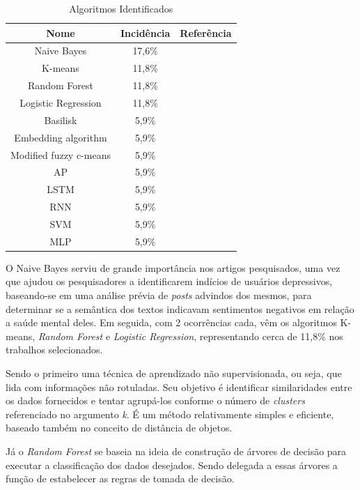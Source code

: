 \documentclass[conference]{IEEEtran}
\begin{document}
\begin{table}[h]
    \centering
    \caption{Algoritmos Identificados}
    \begin{tabular}[t]{c|c|c}
         \hline
         \textbf{Nome} & \textbf{Incidência} & \textbf{Referência} \\
         \hline
         Naive Bayes & 17,6\% & \cite{ArtigoN2, ArtigoN9, ArtigoN12} \\
         K-means & 11,8\% & \cite{ArtigoN5, ArtigoN7} \\
         Random Forest & 11,8\% & \cite{ArtigoN8, ArtigoN12} \\
         Logistic Regression & 11,8\% & \cite{ArtigoN2, ArtigoN12} \\
         Basilisk & 5,9\% & \cite{ArtigoN2} \\
         Embedding algorithm & 5,9\% & \cite{ArtigoN3} \\
         Modified fuzzy c-means & 5,9\% & \cite{ArtigoN4} \\
         AP & 5,9\% & \cite{ArtigoN1} \\
         LSTM & 5,9\% & \cite{ArtigoN3} \\
         RNN & 5,9\% & \cite{ArtigoN4} \\
         SVM & 5,9\% & \cite{ArtigoN1} \\
         MLP & 5,9\% & \cite{ArtigoN8}
    \end{tabular}
    \label{tab:algoritmos_tecnicas}
\end{table}

O Naive Bayes serviu de grande importância nos artigos pesquisados, uma vez que ajudou os pesquisadores a identificarem indícios de usuários depressivos, baseando-se em uma análise prévia de \textit{posts} advindos dos mesmos, para determinar se a semântica dos textos indicavam sentimentos negativos em relação a saúde mental deles. Em seguida, com 2 ocorrências cada, vêm os algoritmos K-means, \textit{Random Forest} e \textit{Logistic Regression}, representando cerca de 11,8\% nos trabalhos selecionados.

Sendo o primeiro uma técnica de aprendizado não supervisionada, ou seja, que lida com informações não rotuladas. Seu objetivo é identificar similaridades entre os dados fornecidos e tentar agrupá-los conforme o número de \textit{clusters} referenciado no argumento \textit{k}. É um método relativamente simples e eficiente, baseado também no conceito de distância de objetos.

Já o \textit{Random Forest} se baseia na ideia de construção de árvores de decisão para executar a classificação dos dados desejados. Sendo delegada a essas árvores a função de estabelecer as regras de tomada de decisão.
\end{document}
